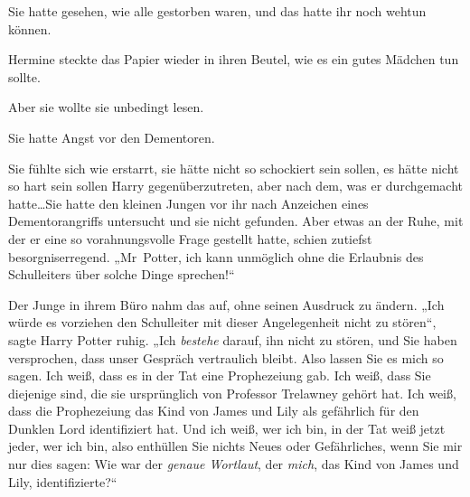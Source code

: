 Sie hatte gesehen, wie alle gestorben waren, und das hatte ihr noch wehtun können.

Hermine steckte das Papier wieder in ihren Beutel, wie es ein gutes Mädchen tun sollte.

Aber sie wollte sie unbedingt lesen.

Sie hatte Angst vor den Dementoren.


Sie fühlte sich wie erstarrt, sie hätte nicht so schockiert sein sollen, es hätte nicht so hart sein sollen Harry gegenüberzutreten, aber nach dem, was er durchgemacht hatte…Sie hatte den kleinen Jungen vor ihr nach Anzeichen eines Dementorangriffs untersucht und sie nicht gefunden. Aber etwas an der Ruhe, mit der er eine so vorahnungsvolle Frage gestellt hatte, schien zutiefst besorgniserregend. „Mr~Potter, ich kann unmöglich ohne die Erlaubnis des Schulleiters über solche Dinge sprechen!“

Der Junge in ihrem Büro nahm das auf, ohne seinen Ausdruck zu ändern. „Ich würde es vorziehen den Schulleiter mit dieser Angelegenheit nicht zu stören“, sagte Harry Potter ruhig. „Ich \emph{bestehe} darauf, ihn nicht zu stören, und Sie haben versprochen, dass unser Gespräch vertraulich bleibt. Also lassen Sie es mich so sagen. Ich weiß, dass es in der Tat eine Prophezeiung gab. Ich weiß, dass Sie diejenige sind, die sie ursprünglich von Professor Trelawney gehört hat. Ich weiß, dass die Prophezeiung das Kind von James und Lily als gefährlich für den Dunklen Lord identifiziert hat. Und ich weiß, wer ich bin, in der Tat weiß jetzt jeder, wer ich bin, also enthüllen Sie nichts Neues oder Gefährliches, wenn Sie mir nur dies sagen: Wie war der \emph{genaue Wortlaut}, der \emph{mich}, das Kind von James und Lily, identifizierte?“

